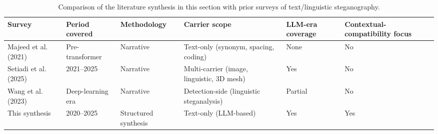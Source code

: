 \begin{table}[H]
  \centering
  \small
  \caption{Comparison of the literature synthesis in this section with prior surveys of text/linguistic steganography.}
  \label{tab:survey_comparison}
  \renewcommand{\arraystretch}{1.25}
  \begin{tabularx}{\textwidth}{|p{2.5cm}|p{1.6cm}|X|X|X|X|}
    \hline
    \textbf{Survey} & \textbf{Period covered} & \textbf{Methodology} & \textbf{Carrier scope} & \textbf{LLM-era coverage} & \textbf{Contextual-compatibility focus} \\
    \hline
    Majeed et al.\ \cite{math9212829} (2021) & Pre-transformer & Narrative & Text-only (synonym, spacing, coding) & None & No \\\hline
    Setiadi et al.\ \cite{Setiadi_Ghosal_Sahu_2025} (2025) & 2021--2025 & Narrative & Multi-carrier (image, linguistic, 3D mesh) & Yes & No \\\hline
    Wang et al.\ \cite{Wang_2023} (2023) & Deep-learning era & Narrative & Detection-side (linguistic steganalysis) & Partial & No \\\hline
    This synthesis & 2020--2025 & Structured synthesis & Text-only (LLM-based) & Yes & Yes \\
    \hline
  \end{tabularx}
\end{table}

